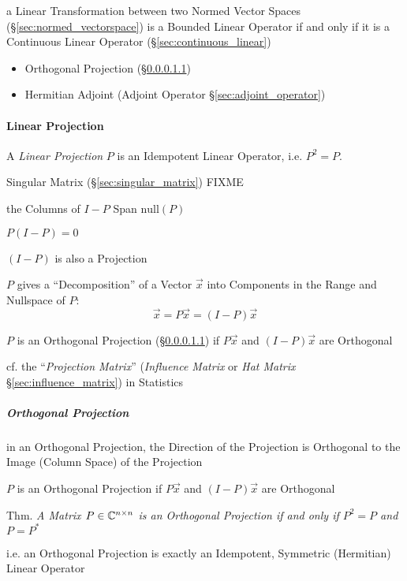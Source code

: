 a Linear Transformation between two Normed Vector Spaces
(\S\ref{sec:normed_vectorspace}) is a Bounded Linear Operator if and
only if it is a Continuous Linear Operator
(\S\ref{sec:continuous_linear})

\begin{itemize}
  \item Orthogonal Projection (\S\ref{sec:orthogonal_projection})
  \item Hermitian Adjoint (Adjoint Operator \S\ref{sec:adjoint_operator})
\end{itemize}



\paragraph{Linear Projection}\label{sec:linear_projection}\hfill

A \emph{Linear Projection} $P$ is an Idempotent Linear Operator, i.e. $P^2 = P$.

Singular Matrix (\S\ref{sec:singular_matrix}) FIXME

the Columns of $I - P$ Span $\mathrm{null}(P)$

$P(I - P) = 0$

$(I - P)$ is also a Projection

$P$ gives a ``Decomposition'' of a Vector $\vec{x}$ into Components in the
Range and Nullspace of $P$:
\[
  \vec{x} = P\vec{x} = (I - P)\vec{x}
\]

$P$ is an Orthogonal Projection (\S\ref{sec:orthogonal_projection}) if
$P\vec{x}$ and $(I-P)\vec{x}$ are Orthogonal

\fist cf. the ``\emph{Projection Matrix}'' (\emph{Influence Matrix} or \emph{Hat
  Matrix} \S\ref{sec:influence_matrix}) in Statistics



\subparagraph{Orthogonal Projection}\label{sec:orthogonal_projection}\hfill

in an Orthogonal Projection, the Direction of the Projection is Orthogonal to
the Image (Column Space) of the Projection

$P$ is an Orthogonal Projection if $P\vec{x}$ and $(I-P)\vec{x}$ are Orthogonal

Thm. \emph{A Matrix $P \in \mathbb{C}^{n \times n}$ is an Orthogonal Projection if
  and only if $P^2 = P$ and $P = P^*$}

i.e. an Orthogonal Projection is exactly an Idempotent, Symmetric (Hermitian)
Linear Operator

